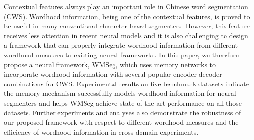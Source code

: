 Contextual features always play an important role in Chinese word segmentation (CWS). Wordhood information, being one of the contextual features, is proved to be useful in many conventional character-based segmenters. However, this feature receives less attention in recent neural models and it is also challenging to design a framework that can properly integrate wordhood information from different wordhood measures to existing neural frameworks. In this paper, we therefore propose a neural framework, WMSeg, which uses memory networks to incorporate wordhood information with several popular encoder-decoder combinations for CWS. Experimental results on five benchmark datasets indicate the memory mechanism successfully models wordhood information for neural segmenters and helps WMSeg achieve state-of-the-art performance on all those datasets. Further experiments and analyses also demonstrate the robustness of our proposed framework with respect to different wordhood measures and the efficiency of wordhood information in cross-domain experiments.
